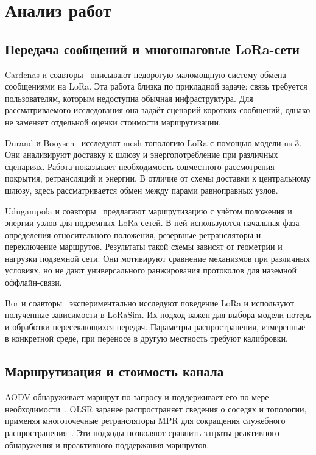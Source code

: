 \section{Анализ работ}

\subsection{Передача сообщений и многошаговые LoRa-сети}

Cardenas и соавторы~\cite{cardenas} описывают недорогую маломощную систему обмена сообщениями на LoRa. Эта работа близка по прикладной задаче: связь требуется пользователям, которым недоступна обычная инфраструктура. Для рассматриваемого исследования она задаёт сценарий коротких сообщений, однако не заменяет отдельной оценки стоимости маршрутизации.

Durand и Booysen~\cite{durand} исследуют mesh-топологию LoRa с помощью модели ns-3. Они анализируют доставку к шлюзу и энергопотребление при различных сценариях. Работа показывает необходимость совместного рассмотрения покрытия, ретрансляций и энергии. В отличие от схемы доставки к центральному шлюзу, здесь рассматривается обмен между парами равноправных узлов.

Udugampola и соавторы~\cite{udugampola} предлагают маршрутизацию с учётом положения и энергии узлов для подземных LoRa-сетей. В ней используются начальная фаза определения относительного положения, резервные ретрансляторы и переключение маршрутов. Результаты такой схемы зависят от геометрии и нагрузки подземной сети. Они мотивируют сравнение механизмов при различных условиях, но не дают универсального ранжирования протоколов для наземной оффлайн-связи.

Bor и соавторы~\cite{bor} экспериментально исследуют поведение LoRa и используют полученные зависимости в LoRaSim. Их подход важен для выбора модели потерь и обработки пересекающихся передач. Параметры распространения, измеренные в конкретной среде, при переносе в другую местность требуют калибровки.

\subsection{Маршрутизация и стоимость канала}

AODV обнаруживает маршрут по запросу и поддерживает его по мере необходимости~\cite{aodv}. OLSR заранее распространяет сведения о соседях и топологии, применяя многоточечные ретрансляторы MPR для сокращения служебного распространения~\cite{olsr}. Эти подходы позволяют сравнить затраты реактивного обнаружения и проактивного поддержания маршрутов.

